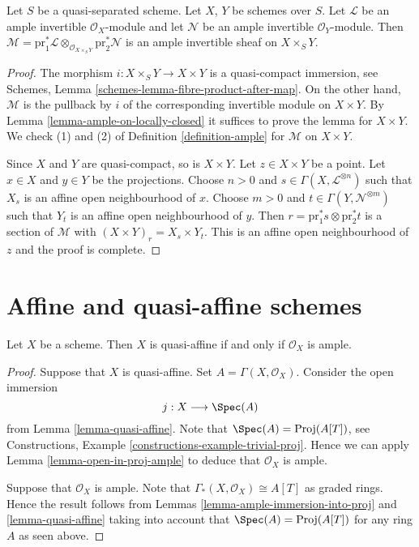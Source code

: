\begin{lemma}
\label{lemma-ample-on-product}
Let $S$ be a quasi-separated scheme. Let $X$, $Y$ be schemes over $S$.
Let $\mathcal{L}$ be an ample invertible $\mathcal{O}_X$-module
and let $\mathcal{N}$ be an ample invertible $\mathcal{O}_Y$-module.
Then $\mathcal{M} = \text{pr}_1^*\mathcal{L}
\otimes_{\mathcal{O}_{X \times_S Y}} \text{pr}_2^*\mathcal{N}$
is an ample invertible sheaf on $X \times_S Y$.
\end{lemma}

\begin{proof}
The morphism $i : X \times_S Y \to X \times Y$ is a quasi-compact
immersion, see Schemes, Lemma \ref{schemes-lemma-fibre-product-after-map}.
On the other hand, $\mathcal{M}$ is the pullback by
$i$ of the corresponding invertible module on $X \times Y$.
By Lemma \ref{lemma-ample-on-locally-closed} it suffices to prove the
lemma for $X \times Y$. We check (1) and (2) of
Definition \ref{definition-ample} for $\mathcal{M}$ on $X \times Y$.

\medskip\noindent
Since $X$ and $Y$ are quasi-compact, so is $X \times Y$.
Let $z \in X \times Y$ be a point. Let $x \in X$ and $y \in Y$
be the projections. Choose $n > 0$ and
$s \in \Gamma(X, \mathcal{L}^{\otimes n})$
such that $X_s$ is an affine open neighbourhood of $x$.
Choose $m > 0$ and
$t \in \Gamma(Y, \mathcal{N}^{\otimes m})$
such that $Y_t$ is an affine open neighbourhood of $y$.
Then $r = \text{pr}_1^*s \otimes \text{pr}_2^*t$ is a section
of $\mathcal{M}$ with $(X \times Y)_r = X_s \times Y_t$.
This is an affine open neighbourhood of $z$ and the proof is complete.
\end{proof}












\section{Affine and quasi-affine schemes}
\label{section-affine-quasi-affine}

\begin{lemma}
\label{lemma-quasi-affine-O-ample}
Let $X$ be a scheme.
Then $X$ is quasi-affine if and only if $\mathcal{O}_X$ is ample.
\end{lemma}

\begin{proof}
Suppose that $X$ is quasi-affine. Set $A = \Gamma(X, \mathcal{O}_X)$.
Consider the open immersion
$$
j : X \longrightarrow \Spec(A)
$$
from Lemma \ref{lemma-quasi-affine}. Note that
$\Spec(A) = \text{Proj}(A[T])$, see
Constructions, Example \ref{constructions-example-trivial-proj}.
Hence we can apply Lemma \ref{lemma-open-in-proj-ample}
to deduce that $\mathcal{O}_X$ is ample.

\medskip\noindent
Suppose that $\mathcal{O}_X$ is ample.
Note that $\Gamma_*(X, \mathcal{O}_X) \cong A[T]$
as graded rings. Hence the result follows from Lemmas
\ref{lemma-ample-immersion-into-proj} and \ref{lemma-quasi-affine}
taking into account that
$\Spec(A) = \text{Proj}(A[T])$ for any ring $A$
as seen above.
\end{proof}

